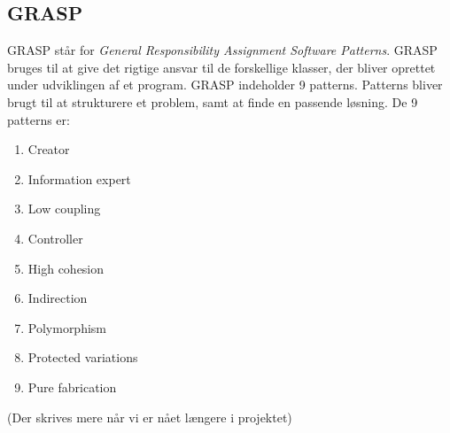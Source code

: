 \subsection{GRASP}
    GRASP står for \textit{General Responsibility Assignment Software Patterns}. GRASP bruges til at give det rigtige ansvar til de forskellige klasser, der bliver oprettet under udviklingen af et program. GRASP indeholder 9 patterns. Patterns bliver brugt til at strukturere et problem, samt at finde en passende løsning. De 9 patterns er:
        \begin{enumerate}
            \item Creator
            \item Information expert
            \item Low coupling
            \item Controller
            \item High cohesion
            \item Indirection
            \item Polymorphism
            \item Protected variations
            \item Pure fabrication
        \end{enumerate}
    (Der skrives mere når vi er nået længere i projektet)
